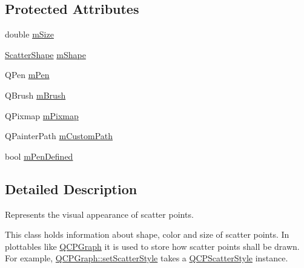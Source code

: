 \subsection*{Protected Attributes}
\begin{DoxyCompactItemize}
\item 
double \mbox{\hyperlink{class_q_c_p_scatter_style_a757da98671eb06b221979373ac2cec91}{m\+Size}}
\item 
\mbox{\hyperlink{class_q_c_p_scatter_style_adb31525af6b680e6f1b7472e43859349}{Scatter\+Shape}} \mbox{\hyperlink{class_q_c_p_scatter_style_af1b327f35f107ed108290187bbc8c7c6}{m\+Shape}}
\item 
Q\+Pen \mbox{\hyperlink{class_q_c_p_scatter_style_a0f6a85e6d1e3ae1ca1b6efb4d4cdfe17}{m\+Pen}}
\item 
Q\+Brush \mbox{\hyperlink{class_q_c_p_scatter_style_a1b9c6ab10aebcaf236f1f45d1d6d64d1}{m\+Brush}}
\item 
Q\+Pixmap \mbox{\hyperlink{class_q_c_p_scatter_style_a7697346c89b19d4cd1d8dd33319ec9e3}{m\+Pixmap}}
\item 
Q\+Painter\+Path \mbox{\hyperlink{class_q_c_p_scatter_style_a813cb074744dc5a2f59cc99d6a10c6f0}{m\+Custom\+Path}}
\item 
bool \mbox{\hyperlink{class_q_c_p_scatter_style_a84ef5aa591ddba07b440f597e1669e78}{m\+Pen\+Defined}}
\end{DoxyCompactItemize}


\subsection{Detailed Description}
Represents the visual appearance of scatter points. 

This class holds information about shape, color and size of scatter points. In plottables like \mbox{\hyperlink{class_q_c_p_graph}{Q\+C\+P\+Graph}} it is used to store how scatter points shall be drawn. For example, \mbox{\hyperlink{class_q_c_p_graph_a12bd17a8ba21983163ec5d8f42a9fea5}{Q\+C\+P\+Graph\+::set\+Scatter\+Style}} takes a \mbox{\hyperlink{class_q_c_p_scatter_style}{Q\+C\+P\+Scatter\+Style}} instance.

